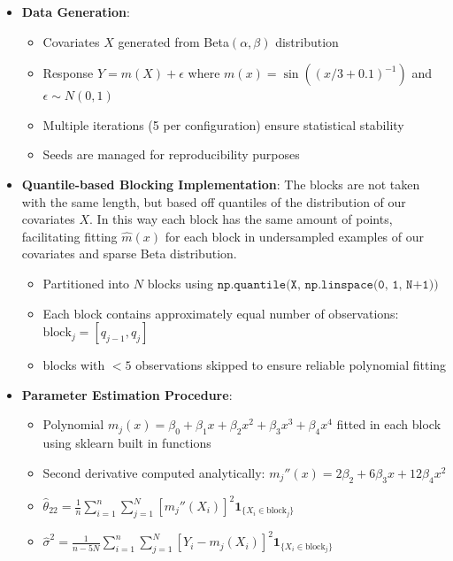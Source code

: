 \documentclass{article}
\begin{document}
\begin{itemize}
    \item \textbf{Data Generation}:
    \begin{itemize}
        \item Covariates $X$ generated from Beta$(\alpha, \beta)$ distribution
        \item Response $Y = m(X) + \epsilon$ where $m(x) = \sin\left((x/3 + 0.1)^{-1}\right)$ and $\epsilon \sim N(0,1)$
        \item Multiple iterations (5 per configuration) ensure statistical stability
        \item Seeds are managed for reproducibility purposes
    \end{itemize}
    
    \item \textbf{Quantile-based Blocking Implementation}:
    The blocks are not taken with the same length, but based off quantiles of the distribution of our covariates $X$. 
    In this way each block has the same amount of points, facilitating fitting $\hat{m}(x)$ for each block in undersampled examples of our covariates and sparse Beta distribution.
    \begin{itemize}
        \item Partitioned into $N$ blocks using $\texttt{np.quantile(X, np.linspace(0, 1, N+1))}$
        \item Each block contains approximately equal number of observations: $\text{block}_j = [q_{j-1}, q_j]$
        \item blocks with $<5$ observations skipped to ensure reliable polynomial fitting
    \end{itemize}
    
    \item \textbf{Parameter Estimation Procedure}:
    \begin{itemize}
        \item Polynomial $m_j(x) = \beta_0 + \beta_1x + \beta_2x^2 + \beta_3x^3 + \beta_4x^4$ fitted in each block using sklearn built in functions
        \item Second derivative computed analytically: $m_j''(x) = 2\beta_2 + 6\beta_3x + 12\beta_4x^2$
        \item $\hat{\theta}_{22} = \frac{1}{n}\sum_{i=1}^n \sum_{j=1}^N [m_j''(X_i)]^2 \mathbf{1}_{\{X_i \in \text{block}_j\}}$
        \item $\hat{\sigma}^2 = \frac{1}{n-5N}\sum_{i=1}^n \sum_{j=1}^N [Y_i - m_j(X_i)]^2 \mathbf{1}_{\{X_i \in \text{block}_j\}}$
    \end{itemize}
    

\end{itemize}
\end{document}
